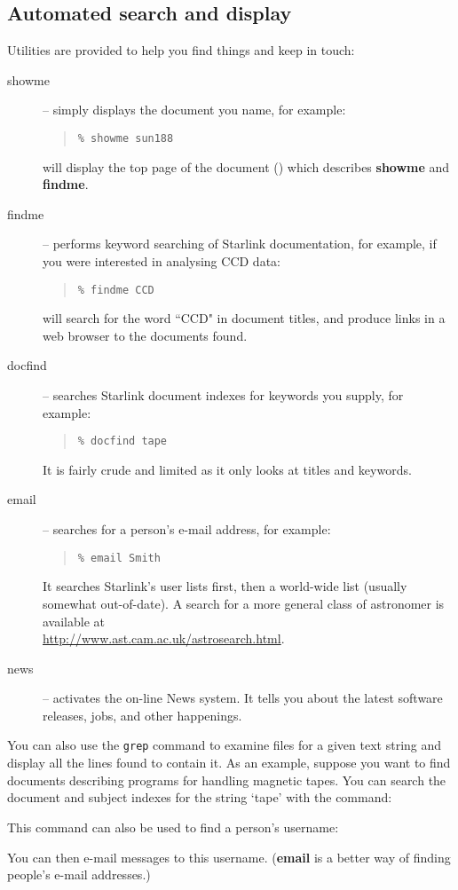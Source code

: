 \documentclass[twoside,11pt,nolof]{starlink}
\begin{document}
\subsection{Automated search and display}

Utilities are provided to help you find things and keep in touch:

\begin{description}
\item [showme] -- simply displays the document you name, for example:
 \begin{quote}
 \texttt{\% showme sun188}
 \end{quote}
 will display the top page of the document
 ()
 which describes \textbf{showme} and \textbf{findme}.
\item [findme] -- performs keyword searching of Starlink documentation,
 for example, if you were interested in analysing CCD data:
 \begin{quote}
 \texttt{\% findme CCD}
 \end{quote}
 will search for the word ``CCD" in document titles, and produce links in a
 web browser to the documents found.
\item [docfind] -- searches Starlink document indexes for keywords you supply,
 for example:
 \begin{quote}
 \texttt{\% docfind tape}
 \end{quote}
 It is fairly crude and limited as it only looks at titles and keywords.
\item [email] -- searches for a person's e-mail address, for example:
 \begin{quote}
 \texttt{\% email Smith}
 \end{quote}
 It searches Starlink's user lists first, then a world-wide list (usually
 somewhat out-of-date).
 A search for a more general class of astronomer is available at\\
 \url{http://www.ast.cam.ac.uk/astrosearch.html}.
\item [news] -- activates the on-line News system.
 It tells you about the latest software releases, jobs, and other happenings.
\end{description}

You can also use the \texttt{grep} command to examine files for a given text
string and display all the lines found to contain it.
As an example, suppose you want to find documents describing programs for
handling magnetic tapes.
You can search the document and subject indexes for the string `tape' with the
command:
{\small
\begin{terminalv}
\end{terminalv}
}
This command can also be used to find a person's username:
{\small
\begin{terminalv}
\end{terminalv}
}
You can then e-mail messages to this username.
(\textbf{email} is a better way of finding people's e-mail addresses.)
\end{document}
